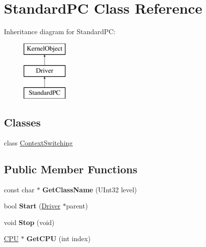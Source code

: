 \hypertarget{class_standard_p_c}{}\section{Standard\+PC Class Reference}
\label{class_standard_p_c}
Inheritance diagram for Standard\+PC\+:\begin{figure}[H]
\begin{center}
\leavevmode
\includegraphics[height=3.000000cm]{class_standard_p_c}
\end{center}
\end{figure}
\subsection*{Classes}
\begin{DoxyCompactItemize}
\item 
class \hyperlink{class_standard_p_c_1_1_context_switching}{Context\+Switching}
\end{DoxyCompactItemize}
\subsection*{Public Member Functions}
\begin{DoxyCompactItemize}
\item 
\mbox{\label{class_standard_p_c_ac16de3a4ecfed594a24b55aa1b4d4d6d}} 
const char $\ast$ {\bfseries Get\+Class\+Name} (U\+Int32 level)
\item 
\mbox{\label{class_standard_p_c_a1d0369260aec606e50d00e5bf9e762ba}} 
bool {\bfseries Start} (\hyperlink{class_driver}{Driver} $\ast$parent)
\item 
\mbox{\label{class_standard_p_c_a671b6322b05275b3165b3fcae25bf560}} 
void {\bfseries Stop} (void)
\item 
\mbox{\label{class_standard_p_c_af06eef2e3a1644dbcc7898a8a71b9fdc}} 
\hyperlink{class_c_p_u}{C\+PU} $\ast$ {\bfseries Get\+C\+PU} (int index)
\end{DoxyCompactItemize}
